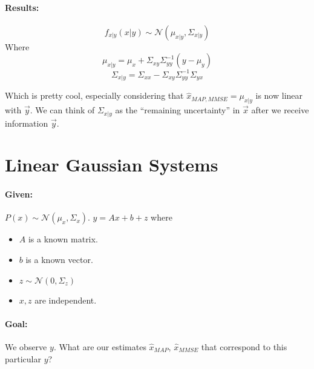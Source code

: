 \documentclass[a4paper,12pt]{report}
\begin{document}
\paragraph{Results: } 

\begin{equation}
f_{x|y}(x|y) \sim \mathcal N(\mu_{x|y}, \Sigma_{x|y})
\end{equation}
Where 
\begin{equation}
\mu_{x|y} = \mu_x + \Sigma_{xy} \Sigma_{yy}^{-1} (y-\mu_y)
\end{equation}
\begin{equation}
\Sigma_{x|y} = \Sigma_{xx} - \Sigma_{xy}\Sigma^{-1}_{yy}\Sigma_{yx}
\end{equation}

Which is pretty cool, especially considering that $\hat x_{MAP, MMSE} = \mu_{x|y}$ is now linear with $\vec y$. We can think of $\Sigma_{x|y}$ as the ``remaining uncertainty'' in $\vec x$ after we receive information $\vec y$. 


\section{Linear Gaussian Systems}

\paragraph{Given: } $P(x) \sim \mathcal N(\mu_x, \Sigma_x)$. $y = Ax+b+z$ where
\begin{itemize}
\item $A$ is a known matrix.
\item $b$ is a known vector.
\item $z\sim \mathcal N(0, \Sigma_z)$
\item $x,z$ are independent.
\end{itemize}

\paragraph{Goal: } We observe $y$. What are our estimates $\hat x_{MAP}$, $\hat x_{MMSE}$ that correspond to this particular $y$?
\end{document}
